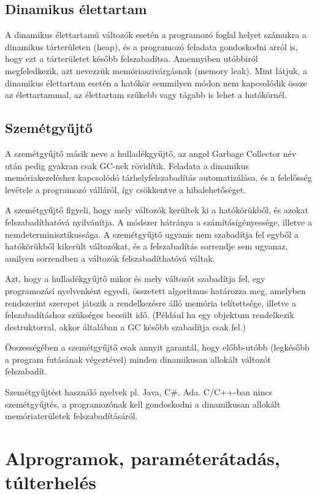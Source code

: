 \documentclass[margin=0px]{article}
\begin{document}
\subsection{Dinamikus élettartam}

A dinamikus élettartamú változók esetén a programozó foglal helyet számukra a dinamikus tárterületen (heap), és a programozó feladata gondoskodni arról is, hogy ezt a tárterületet később felszabadítsa. Amennyiben utóbbiról megfeledkezik, azt nevezzük memóriaszivárgásnak (memory leak).
Mint látjuk, a dinamikus élettartam esetén a hatókör semmilyen módon nem kapcsolódik össze az élettartammal, az élettartam szűkebb vagy tágabb is lehet a hatókörnél.

\subsection{Szemétgyűjtő}

A szemétgyűjtő másik neve a hulladékgyűjtő, az angol Garbage Collector név után pedig gyakran csak GC-nek rövidítik. Feladata a dinamikus memóriakezeléshez kapcsolódó tárhelyfelszabadítás automatizálása, és a felelősség levétele a programozó válláról, így csökkentve a hibalehetőséget.

A szemétgyűjtő figyeli, hogy mely változók kerültek ki a hatókörükből, és azokat felszabadíthatóvá nyilvánítja. A módszer hátránya a számításigényessége, illetve a nemdeterminisztikussága. A szemétgyűjtő ugyanis nem szabadítja fel egyből a hatókörükből kikerült változókat, és a felszabadítás sorrendje sem ugyanaz, amilyen sorrendben a változók felszabadíthatóvá váltak.

Azt, hogy a hulladékgyűjtő mikor és mely változót szabadítja fel, egy programozási nyelvenként egyedi, összetett algoritmus határozza meg, amelyben rendszerint szerepet játszik a rendelkezésre álló memória telítettsége, illetve a felszabadításhoz szükséges becsült idő. (Például ha egy objektum rendelkezik destruktorral, akkor általában a GC később szabadítja csak fel.)

Összességében a szemétgyűjtő csak annyit garantál, hogy előbb-utóbb (legkésőbb a program futásának végeztével) minden dinamikusan allokált változót felszabadít.

Szemétgyűjtést használó nyelvek pl. Java, C\#, Ada. C/C++-ban nincs szemétgyűjtés, a programozónak kell gondoskodni a dinamikusan allokált memóriaterületek felszabadításáról.

\section{Alprogramok, paraméterátadás, túlterhelés}
\end{document}
